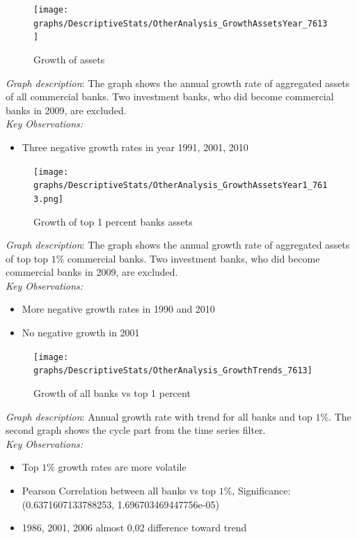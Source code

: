 \documentclass[12pt, a4paper]{article} %
\begin{document}
\begin{figure}[hbtp]
\centering
\caption{Growth of assets}
\texttt{[image: graphs/DescriptiveStats/OtherAnalysis\_GrowthAssetsYear\_7613]}
\end{figure}

\noindent \textit{Graph description}: The graph shows the annual growth rate of aggregated assets of all commercial banks. Two investment banks, who did become commercial banks in 2009, are excluded. \\

\noindent \textit{Key Observations:}
\begin{itemize}
\item Three negative growth rates in year 1991, 2001, 2010
\end{itemize}

\begin{figure}[hbtp]
\centering
\caption{Growth of top 1 percent banks assets}
\texttt{[image: graphs/DescriptiveStats/OtherAnalysis\_GrowthAssetsYear1\_7613.png]}
\end{figure}

\noindent \textit{Graph description}: The graph shows the annual growth rate of aggregated assets of top top $1\%$ commercial banks. Two investment banks, who did become commercial banks in 2009, are excluded. \\

\noindent \textit{Key Observations:}
\begin{itemize}
\item More negative growth rates in 1990 and 2010
\item No negative growth in 2001

\end{itemize}

\begin{figure}[hbtp]
\centering
\caption{Growth of all banks vs top 1 percent}
\texttt{[image: graphs/DescriptiveStats/OtherAnalysis\_GrowthTrends\_7613]}
\end{figure}

\noindent \textit{Graph description}: Annual growth rate with trend for all banks and top $1\%$. The second graph shows the cycle part from the time series filter. \\

\noindent \textit{Key Observations:}
\begin{itemize}
\item Top $1\%$ growth rates are more volatile
\item Pearson Correlation between all banks vs top $1\%$, Significance: (0.6371607133788253, 1.696703469447756e-05)
\item 1986, 2001, 2006 almost 0,02 difference toward trend
\end{itemize}
\end{document}
